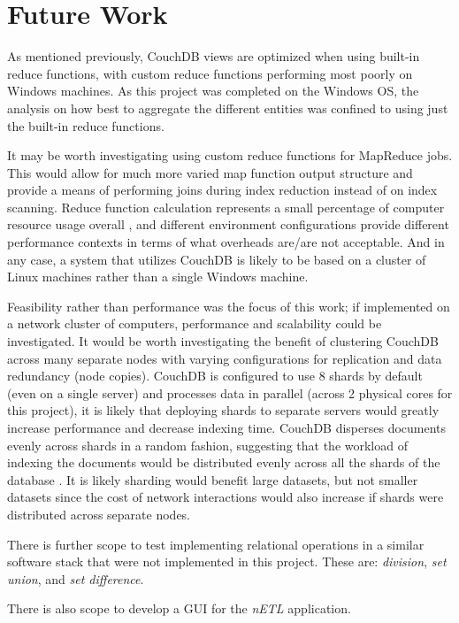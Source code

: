 \section{Future Work}
As mentioned previously, CouchDB views are optimized when using built-in reduce functions, with custom reduce functions performing most poorly on Windows machines. As this project was completed on the Windows OS, the analysis on how best to aggregate the different entities was confined to using just the built-in reduce functions.

It may be worth investigating using custom reduce functions for MapReduce jobs. This would allow for much more varied map function output structure and provide a means of performing joins during index reduction instead of on index scanning. Reduce function calculation represents a small percentage of computer resource usage overall \cite{slack1Nov}, and different environment configurations provide different performance contexts in terms of what overheads are/are not acceptable. And in any case, a system that utilizes CouchDB is likely to be based on a cluster of Linux machines rather than a single Windows machine.

Feasibility rather than performance was the focus of this work; if implemented on a network cluster of computers, performance and scalability could be investigated. It would be worth investigating the benefit of clustering CouchDB across many separate nodes with varying configurations for replication and data redundancy (node copies). CouchDB is configured to use 8 shards by default (even on a single server) and processes data in parallel (across 2 physical cores for this project), it is likely that deploying shards to separate servers would greatly increase performance and decrease indexing time. CouchDB disperses documents evenly across shards in a random fashion, suggesting that the workload of indexing the documents would be distributed evenly across all the shards of the database \cite{slack7Nov}. It is likely sharding would benefit large datasets, but not smaller datasets since the cost of network interactions would also increase if shards were distributed across separate nodes.

There is further scope to test implementing relational operations in a similar software stack that were not implemented in this project. These are: \textit{division}, \textit{set union}, and \textit{set difference}.

There is also scope to develop a GUI for the \textit{nETL} application.